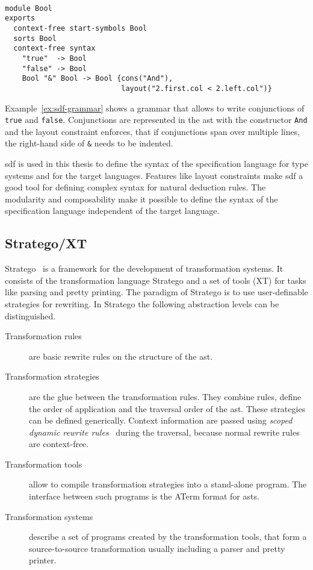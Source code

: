 \begin{example}{~}
\begin{verbatim}
module Bool
exports
  context-free start-symbols Bool
  sorts Bool
  context-free syntax
    "true"  -> Bool
    "false" -> Bool
    Bool "&" Bool -> Bool {cons("And"),
                           layout("2.first.col < 2.left.col")}
\end{verbatim}
\label{ex:sdf-grammar}
\end{example}

Example~\ref{ex:sdf-grammar} shows a grammar that allows to write
conjunctions of \verb|true| and \verb|false|. Conjunctions are
represented in the \gls{ast} with the constructor \verb|And| and the
layout constraint enforces, that if conjunctions span over multiple
lines, the right-hand side of \verb|&| needs to be indented.

\gls{sdf} is used in this thesis to define the syntax of the
specification language for type systems and for the target
languages. Features like layout constraints make \gls{sdf} a good tool
for defining complex syntax for natural deduction rules. The
modularity and composability make it possible to define the syntax of
the specification language independent of the target language.
\subsection{Stratego/XT}
Stratego~\cite{Visser01} is a framework for the development of
transformation systems. It consists of the transformation language
Stratego and a set of tools (XT) for tasks like parsing and pretty
printing. The paradigm of Stratego is to use user-definable strategies
for rewriting. In Stratego the following abstraction levels can be
distinguished.

\begin{description}
\item[Transformation rules] are basic rewrite rules on the structure
  of the \gls{ast}.
\item[Transformation strategies] are the glue between the
  transformation rules. They combine rules, define the order of
  application and the traversal order of the \gls{ast}. These
  strategies can be defined generically. Context information are
  passed using \textit{scoped dynamic rewrite
    rules}~\cite{Visser01scopeddynamic} during the traversal, because
  normal rewrite rules are context-free.
\item[Transformation tools] allow to compile transformation strategies
  into a stand-alone program. The interface between such programs is
  the ATerm format for \glspl{ast}.
\item[Transformation systems] describe a set of programs created by
  the transformation tools, that form a source-to-source
  transformation usually including a parser and pretty printer.
\end{description}

